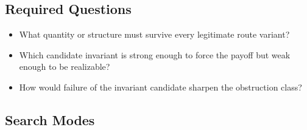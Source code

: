 \documentclass[11pt]{article}
\begin{document}
\subsection*{Required Questions}
\begin{itemize}[leftmargin=*,itemsep=0.2em]
\item What quantity or structure must survive every legitimate route variant?
\item Which candidate invariant is strong enough to force the payoff but weak enough to be realizable?
\item How would failure of the invariant candidate sharpen the obstruction class?
\end{itemize}
\subsection*{Search Modes}
\end{document}
